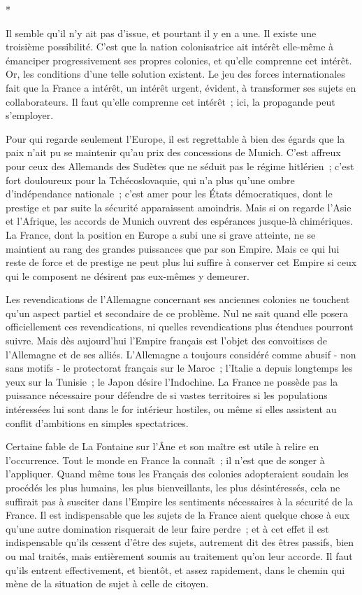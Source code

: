 \documentclass[french,twoside]{book} %
\begin{document}
\begin{center}
\noindent \centerline{*}\par
\end{center}

\noindent Il semble qu'il n'y ait pas d'issue, et pourtant il y en a une. Il existe une troisième possibilité. C'est que la nation colonisatrice ait intérêt elle-même à émanciper progressivement ses propres colonies, et qu'elle comprenne cet intérêt. Or, les conditions d'une telle solution existent. Le jeu des forces internationales fait que la France a intérêt, un intérêt urgent, évident, à trans­former ses sujets en collaborateurs. Il faut qu'elle comprenne cet intérêt ; ici, la propagande peut s'employer.\par
Pour qui regarde seulement l'Europe, il est regrettable à bien des égards que la paix n'ait pu se maintenir qu'au prix des concessions de Munich. C'est affreux pour ceux des Allemands des Sudètes que ne séduit pas le régime hitlérien ; c'est fort douloureux pour la Tchécoslovaquie, qui n'a plus qu'une ombre d'indépendance nationale ; c'est amer pour les États démocratiques, dont le prestige et par suite la sécurité apparaissent amoindris. Mais si on regarde l'Asie et l'Afrique, les accords de Munich ouvrent des espérances jusque-là chimériques. La France, dont la position en Europe a subi une si grave atteinte, ne se maintient au rang des grandes puissances que par son Empire. Mais ce qui lui reste de force et de prestige ne peut plus lui suffire à conserver cet Empire si ceux qui le composent ne désirent pas eux-mêmes y demeurer.\par
Les revendications de l'Allemagne concernant ses anciennes colonies ne touchent qu'un aspect partiel et secondaire de ce problème. Nul ne sait quand elle posera officiellement ces revendications, ni quelles revendications plus étendues pourront suivre. Mais dès aujourd’hui l'Empire français est l'objet des convoitises de l'Allemagne et de ses alliés. L'Allemagne a toujours considéré comme abusif - non sans motifs - le protectorat français sur le Maroc ; l'Italie a depuis longtemps les yeux sur la Tunisie ; le Japon désire l'Indochine. La France ne possède pas la puissance nécessaire pour défendre de si vastes territoires si les populations intéressées lui sont dans le for intérieur hostiles, ou même si elles assistent au conflit d'ambitions en simples spectatrices.\par
Certaine fable de La Fontaine sur l'Âne et son maître est utile à relire en l'occurrence. Tout le monde en France la connaît ; il n'est que de songer à l'appliquer. Quand même tous les Français des colonies adopteraient soudain les procédés les plus humains, les plus bienveillants, les plus désintéressés, cela ne suffirait pas à susciter dans l'Empire les sentiments nécessaires à la sécurité de la France. Il est indispensable que les sujets de la France aient quelque chose à eux qu'une autre domination risquerait de leur faire perdre ; et à cet effet il est indispensable qu'ils cessent d'être des sujets, autrement dit des êtres passifs, bien ou mal traités, mais entièrement soumis au traitement qu'on leur accorde. Il faut qu'ils entrent effectivement, et bientôt, et assez rapide­ment, dans le chemin qui mène de la situation de sujet à celle de citoyen.\par
\end{document}
